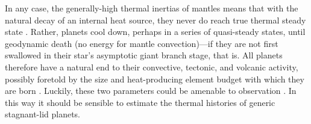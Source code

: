 In any case, the generally-high thermal inertias of mantles means that with the natural decay of an internal heat source, they never do reach true thermal steady state \citep[cf.][]{tozer_present_1972}. Rather, planets cool down, perhaps in a series of quasi-steady states, until geodynamic death (no energy for mantle convection)---if they are not first swallowed in their star's asymptotic giant branch stage, that is. All planets therefore have a natural end to their convective, tectonic, and volcanic activity, possibly foretold by the size and heat-producing element budget with which they are born \citep{stevenson_styles_2003, frank_radiogenic_2014, unterborn_mantle_2022}. Luckily, these two parameters could be amenable to observation \citep{nimmo_radiogenic_2020, wang_europium_2020}. In this way it should be sensible to estimate the thermal histories of generic stagnant-lid planets.


























%
%
%
%












